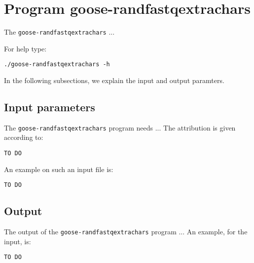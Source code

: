 \section{Program goose-randfastqextrachars}
The \texttt{goose-randfastqextrachars} ...

For help type:
\begin{lstlisting}
./goose-randfastqextrachars -h
\end{lstlisting}
In the following subsections, we explain the input and output paramters.

\subsection*{Input parameters}

The \texttt{goose-randfastqextrachars} program needs ...
The attribution is given according to:
\begin{lstlisting}
TO DO
\end{lstlisting}

An example on such an input file is:
\begin{lstlisting}
TO DO
\end{lstlisting}

\subsection*{Output}
The output of the \texttt{goose-randfastqextrachars} program ...
An example, for the input, is:
\begin{lstlisting}
TO DO
\end{lstlisting}
